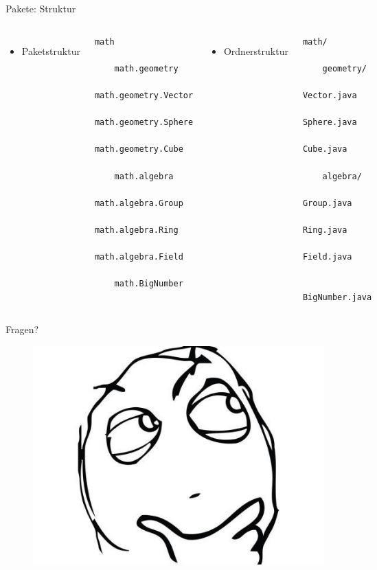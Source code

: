 \documentclass[18pt]{beamer}
\begin{document}
\begin{frame}[fragile]{Pakete: Struktur}
    \begin{columns}[c]
        \begin{itemize}
            \item Paketstruktur
        \end{itemize}
        \begin{exampleblock}{}
            \begin{lstlisting}[basicstyle=\scriptsize]
math

    math.geometry
        math.geometry.Vector
        math.geometry.Sphere
        math.geometry.Cube

    math.algebra
        math.algebra.Group
        math.algebra.Ring
        math.algebra.Field

    math.BigNumber
            \end{lstlisting}
        \end{exampleblock}

        \begin{itemize}
            \item Ordnerstruktur
        \end{itemize}
        \begin{exampleblock}{}
            \begin{lstlisting}[basicstyle=\scriptsize]
math/

    geometry/
        Vector.java
        Sphere.java
        Cube.java

    algebra/
        Group.java
        Ring.java
        Field.java

    BigNumber.java
            \end{lstlisting}
        \end{exampleblock}
    \end{columns}
\end{frame}

\begin{frame}{Fragen?}
    \begin{figure}
        \includegraphics[scale=.32]{img/Question-Rage-Face.jpg}
    \end{figure}
\end{frame}
\end{document}
